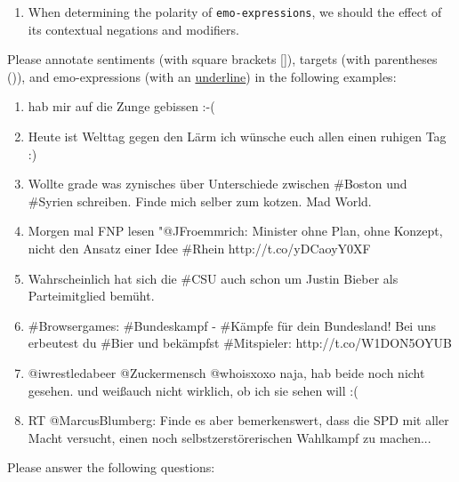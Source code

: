 \documentclass[12pt,fleqn]{scrreprt}
\begin{document}
\begin{enumerate}[I)]
\begin{enumerate}
  \item When determining the polarity of \texttt{emo-expressions}, we
    should \underline{\hspace{4cm}} the effect of its contextual
    negations and modifiers.
  \end{enumerate}

  {\bfseries\item Please annotate sentiments (with square brackets
    []), targets (with parentheses ()), and emo-expressions (with an
    \underline{underline}) in the following examples:}
  \begin{enumerate}
  \item hab mir auf die Zunge gebissen :-(

  \item Heute ist Welttag gegen den L\"arm ich w\"unsche euch allen
    einen ruhigen Tag :)

  \item Wollte grade was zynisches \"uber Unterschiede zwischen
    \#Boston und \#Syrien schreiben. Finde mich selber zum kotzen. Mad
    World.

  \item Morgen mal FNP lesen \smiley{} "@JFroemmrich: Minister ohne
    Plan, ohne Konzept, nicht den Ansatz einer Idee \#Rhein
    http://t.co/yDCaoyY0XF

  \item Wahrscheinlich hat sich die \#CSU auch schon um Justin Bieber
    als Parteimitglied bem\"uht. \frownie{}

  \item \#Browsergames: \#Bundeskampf - \#K\"ampfe f\"ur dein
    Bundesland! Bei uns erbeutest du \#Bier und bek\"ampfst
    \#Mitspieler: http://t.co/W1DON5OYUB

  \item @iwrestledabeer @Zuckermensch @whoisxoxo naja, hab beide noch
    nicht gesehen. und wei\ss auch nicht wirklich, ob ich sie sehen
    will :(

  \item RT @MarcusBlumberg: Finde es aber bemerkenswert, dass die SPD
    mit aller Macht versucht, einen noch selbstzerst\"orerischen
    Wahlkampf zu machen...
  \end{enumerate}

  {\bfseries\item Please answer the following questions:}

  \opentwo

  \opentwo

  \opentwo

  \opentwo

  \opentwo
\end{enumerate}
\end{document}
